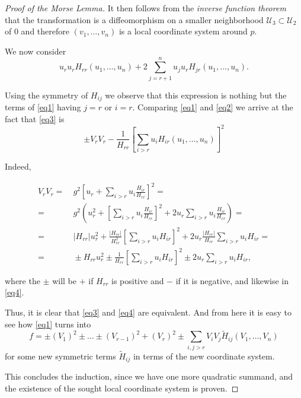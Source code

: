 \begin{proof}[Proof of the Morse Lemma]
    It then follows from the \textit{inverse function theorem} that the transformation is a diffeomorphism on a smaller neighborhood $\mathcal{U}_3\subset \mathcal{U}_2$ of $0$ and therefore $(v_1,\dots, v_n)$ is a local coordinate system around $p$.

    \bigskip

    We now consider
    \begin{equation}
        u_ru_rH_{rr}(u_1,\dots, u_n) + 2\sum_{j=r+1}^n u_ju_rH_{jr}(u_1,\dots, u_n).
    \label{eq3}
    \end{equation}

    Using the symmetry of $H_{ij}$ we observe that this expression is nothing but the terms of \eqref{eq1} having $j=r$ or $i=r$. Comparing \eqref{eq1} and \eqref{eq2} we arrive at the fact that \eqref{eq3} is
    \begin{equation}
        \pm V_rV_r - \frac{1}{H_{rr}}\left[ \sum_{i>r} u_iH_{ir}(u_1,\dots, u_n) \right]^2
    \label{eq4}
    \end{equation}

    Indeed,

    \begin{align*}
        V_rV_r =& ~ g^2 \left[u_r+\sum_{i>r}u_i\frac{H_{ir}}{H_{rr}}\right]^2 =\\
        =& ~ g^2 \left( u_r^2 + \left[ \sum_{i>r}u_i\frac{H_{ir}}{H_{rr}}\right]^2 + 2u_r\sum_{i>r}u_i\frac{H_{ir}}{H_{rr}} \right) = \\
        =& ~ |H_{rr}| u_r^2 + \frac{|H_{rr}|}{H_{rr}^2} \left[\sum_{i>r}u_iH_{ir}\right]^2 + 2u_r\frac{|H_{rr}|}{H_{rr}}\sum_{i>r}u_iH_{ir} = \\
        =& ~ \pm H_{rr}u_r^2 \pm \frac{1}{H_{rr}}\left[\sum_{i>r}u_iH_{ir}\right]^2 \pm 2u_r\sum_{i>r}u_iH_{ir},
    \end{align*}

    \vspace{2em}

    where the $\pm$ will be $+$ if $H_{rr}$ is positive and $-$ if it is negative, and likewise in \eqref{eq4}.
    \bigskip

    Thus, it is clear that \eqref{eq3} and \eqref{eq4} are equivalent. And from here it is easy to see how \eqref{eq1} turns into
    \begin{equation*}
        f = \pm (V_1)^2 \pm\dots\pm (V_{r-1})^2 + (V_r)^2  \pm \sum_{i,j > r} V_iV_j\tilde{H}_{ij}(V_1,\dots,V_n)
    \end{equation*}
    for some new symmetric terms $\tilde{H}_{ij}$ in terms of the new coordinate system.

    This concludes the induction, since we have one more quadratic summand, and the existence of the sought local coordinate system is proven.

\end{proof}

